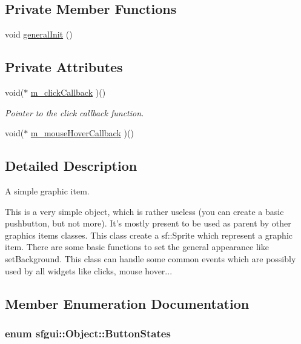 \subsection*{Private Member Functions}
\begin{CompactItemize}
\item 
void \hyperlink{classsfgui_1_1Object_d2750b3d51a3a208739ed6c0c57df6aa}{generalInit} ()
\end{CompactItemize}
\subsection*{Private Attributes}
\begin{CompactItemize}
\item 
void($\ast$ \hyperlink{classsfgui_1_1Object_5917de9750aa3c8d282899ee83f835b4}{m\_\-clickCallback} )()
\begin{CompactList}\small\item\em Pointer to the click callback function. \item\end{CompactList}\item 
void($\ast$ \hyperlink{classsfgui_1_1Object_ddff61a2d47a7b25e05aa5b6311417ea}{m\_\-mouseHoverCallback} )()
\end{CompactItemize}


\subsection{Detailed Description}
A simple graphic item. 

This is a very simple object, which is rather useless (you can create a basic pushbutton, but not more). It's mostly present to be used as parent by other graphics items classes. This class create a sf::Sprite which represent a graphic item. There are some basic functions to set the general appearance like setBackground. This class can handle some common events which are possibly used by all widgets like clicks, mouse hover... 

\subsection{Member Enumeration Documentation}
\hypertarget{classsfgui_1_1Object_8a7d7ae20a88b7ef8a104f7e6c8596ce}{
\subsubsection[ButtonStates]{\setlength{\rightskip}{0pt plus 5cm}enum {\bf sfgui::Object::ButtonStates}}}
\label{classsfgui_1_1Object_8a7d7ae20a88b7ef8a104f7e6c8596ce}


